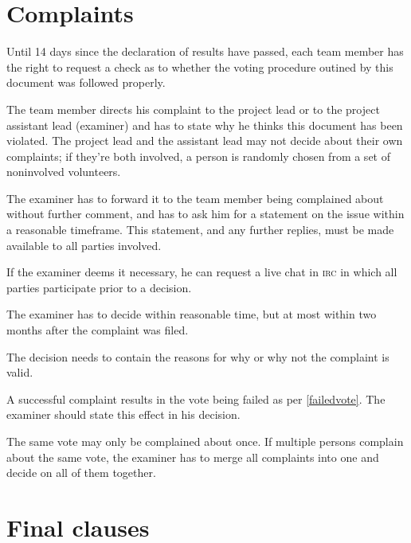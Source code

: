\documentclass[10pt,a4paper,DIV=calc,headings=medium,twocolumn,final]{scrartcl}
\newcommand\irc{\textsc{irc}\xspace}
\begin{document}
\section{Complaints}

\begin{contract}

  Until 14 days since the declaration of results have passed, each
  team member has the right to request a check as to whether the
  voting procedure outined by this document was followed properly.


  The team member directs his complaint to the project lead or to the
  project assistant lead (examiner) and has to state why he thinks
  this document has been violated. The project lead and the assistant
  lead may not decide about their own complaints; if they’re both
  involved, a person is randomly chosen from a set of noninvolved
  volunteers.

  The examiner has to forward it to the team member being complained
  about without further comment, and has to ask him for a statement on
  the issue within a reasonable timeframe. This statement, and any
  further replies, must be made available to all parties involved.

  If the examiner deems it necessary, he can request a live chat in
  \irc in which all parties participate prior to a decision.


  The examiner has to decide within reasonable time, but at most
  within two months after the complaint was filed.

  The decision needs to contain the reasons for why or why not the
  complaint is valid.


  A successful complaint results in the vote being failed as per
  \ref{failedvote}. The examiner should state this effect in his
  decision.


  The same vote may only be complained about once. If multiple persons
  complain about the same vote, the examiner has to merge all
  complaints into one and decide on all of them together.
\end{contract}

\section{Final clauses}
\end{document}
